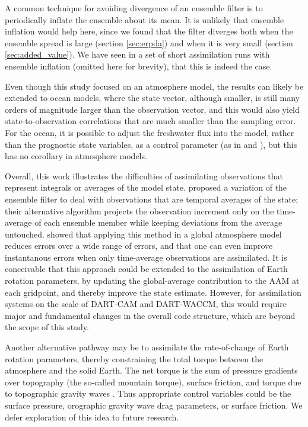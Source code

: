 A common technique for avoiding divergence of an ensemble filter is to periodically inflate the ensemble about its mean. 
It is unlikely that ensemble inflation would help here, since we found that the filter diverges both when the ensemble spread is large (section \ref{sec:erpda}) and when it is very small (section \ref{sec:added_value}). 
We have seen in a set of short assimilation runs with ensemble inflation (omitted here for brevity), that this is indeed the case. 


Even though this study focused on an atmosphere model, the results can likely be extended to ocean models, where the state vector, although smaller, is still many orders of magnitude larger than the observation vector, and this would also yield state-to-observation correlations that are much smaller than the sampling error. 
For the ocean, it is possible to adjust the freshwater flux into the model, rather than the prognostic state variables, as a control parameter (as in \citet{Saynisch2010} and \citet{Saynisch2012}), but this has no corollary in atmosphere models. 


Overall, this work illustrates the difficulties of assimilating observations that represent integrals or averages of the model state. 
\citet{Dirren2005} proposed a variation of the ensemble filter to deal with observations that are temporal averages of the state; their alternative algorithm projects the observation increment only on the time-average of each ensemble member while keeping deviations from the average untouched. 
\citet{Huntley2009} showed that applying this method in a global atmosphere model reduces errors over a wide range of errors, and that one can even improve instantanous errors when only time-average observations are assimilated. 
It is conceivable that this approach could be extended to the assimilation of Earth rotation parameters, by updating the global-average contribution to the AAM at each gridpoint, and thereby improve the state estimate. 
However, for assimilation systems on the scale of DART-CAM and DART-WACCM, this would require major and fundamental changes in the overall code structure, which are beyond the scope of this study. 


Another alternative pathway may be to assimilate the rate-of-change of Earth rotation parameters, thereby constraining the total torque between the atmosphere and the solid Earth. 
The net torque is the sum of pressure gradients over topography (the so-called mountain torque), surface friction, and torque due to topographic gravity waves \citep{Lejenas1997}. 
Thus appropriate control variables could be the surface pressure, orographic gravity wave drag parameters, or surface friction. 
We defer exploration of this idea to future research. 



